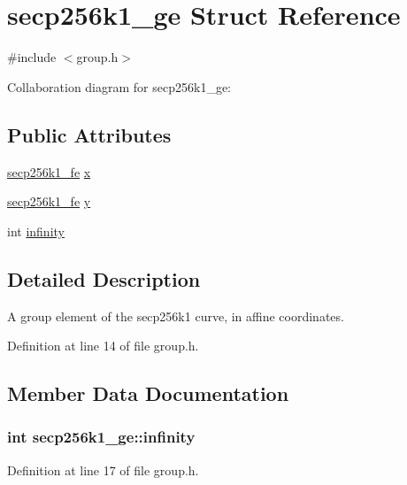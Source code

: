 \hypertarget{structsecp256k1__ge}{}\section{secp256k1\+\_\+ge Struct Reference}
\label{structsecp256k1__ge}


{\ttfamily \#include $<$group.\+h$>$}



Collaboration diagram for secp256k1\+\_\+ge\+:
\subsection*{Public Attributes}
\begin{DoxyCompactItemize}
\item 
\hyperlink{structsecp256k1__fe}{secp256k1\+\_\+fe} \hyperlink{structsecp256k1__ge_a3c04a97b606c82ea87e55d4a06f06b6e}{x}
\item 
\hyperlink{structsecp256k1__fe}{secp256k1\+\_\+fe} \hyperlink{structsecp256k1__ge_a604295983a1f4aa6e8b5b0f1e46f9ee0}{y}
\item 
int \hyperlink{structsecp256k1__ge_a1cdb35fe7abf6f17c08e4375eeb26628}{infinity}
\end{DoxyCompactItemize}


\subsection{Detailed Description}
A group element of the secp256k1 curve, in affine coordinates. 

Definition at line 14 of file group.\+h.



\subsection{Member Data Documentation}
\hypertarget{structsecp256k1__ge_a1cdb35fe7abf6f17c08e4375eeb26628}{}
\subsubsection[{infinity}]{\setlength{\rightskip}{0pt plus 5cm}int secp256k1\+\_\+ge\+::infinity}\label{structsecp256k1__ge_a1cdb35fe7abf6f17c08e4375eeb26628}


Definition at line 17 of file group.\+h.

